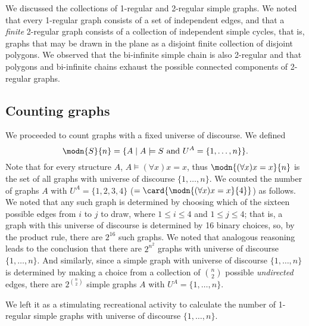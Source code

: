 We discussed the collections of 1-regular and 2-regular simple graphs. We noted that every 1-regular graph consists of a set of independent edges, and that a \emph{finite} 2-regular graph consists of a collection of independent simple cycles, that is, graphs that may be drawn in the plane as a disjoint finite collection of disjoint polygons. We observed that the bi-infinite simple chain is also 2-regular and that polygons and bi-infinite chains exhaust the possible connected components of 2-regular graphs.
\subsection{Counting graphs}

We proceeded to count graphs with a fixed universe of discourse. We defined
\[\modn{S}{n}=\{A\mid A\models S\mbox{ and }U^A=\{1,\ldots,n\}\}.\] Note that for every structure $A$, $A\models (\forall x)x=x$, thus  $\modn{(\forall x)x=x}{n}$ is the set of all graphs with universe of discourse $\{1,\ldots,n\}$. 
We counted the number of graphs $A$ with $U^A=\{1,2,3,4\}$ ($=\card{\modn{(\forall x)x=x}{4}}$) as follows. We noted that any such graph is determined by choosing which of the sixteen possible edges from $i$ to $j$ to draw, where $1\leq i\leq 4$ and $1\leq j\leq 4$; that is, a graph with this universe of discourse is determined by 16 binary choices, so, by the product rule, there are $2^{16}$ such graphs. We noted that analogous reasoning leads to the conclusion that there are $2^{n^2}$ graphs with universe of discourse $\{1,\ldots, n\}$. And similarly, since a simple graph with universe of discourse $\{1,\ldots, n\}$ is determined by making a choice from a collection of $\binom{n}{2}$ possible \emph{undirected} edges, there are $2^{\binom{n}{2}}$ simple graphs $A$ with $U^A=\{1,\ldots, n\}$. 

We left it as a stimulating recreational activity to calculate the number of 1-regular simple graphs with universe of discourse $\{1,\ldots, n\}$. 

